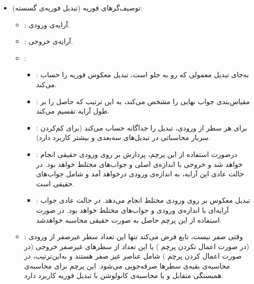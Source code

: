 \documentclass[12pt,a4paper]{article}
\theoremstyle{definition}
\theoremstyle{theorem}
\theoremstyle{definition}
\begin{document}
\begin{itemize}
\begin{itemize}
\end{itemize}

\item
توصیف‌گرهای فوریه (تبدیل فوریه‌ی گسسته): 


{\small {}}


\begin{itemize}
\renewcommand{\labelitemii}{$\circ$}
\item
{} : 
آرایه‌ی ورودی.
\item
{} : 
آرایه‌ی خروجی.

\item
{} : 

\begin{itemize}
\renewcommand{\labelitemiii}{$\diamond$}
\item
{} : 
 به‌جای تبدیل معمولی که رو به جلو است، تبدیل معکوس فوریه را حساب می‌کند.

\item
{} :
مقیاس‌بندی جواب نهایی را مشخص می‌کند، به این ترتیب که حاصل‌ را بر طول آرایه تقسیم می‌کند.

\item
{} :
برای هر سطر از ورودی، تبدیل را جداگانه حساب می‌کند (برای کم‌کردن سربار محاسباتی در تبدیل‌های سه‌بعدی و بیشتر کاربرد دارد).

\item
{} :
درصورت استفاده از این پرچم، پردازش بر روی ورودی حقیقی انجام خواهد شد و خروجی با اندازه‌ی اصلی و جواب‌های مختلط خواهد بود. در حالت عادی این آرایه، به اندازه‌ی ورودی درخواهد آمد و شامل جواب‌های حقیقی است.
\item
{} : 
تبدیل معکوس بر روی ورودی مختلط انجام می‌دهد. در حالت عادی جواب آرایه‌ای با اندازه‌ی ورودی و جواب‌های مختلط خواهد بود. در صورت استفاده از این پرچم حاصل به صورت حقیقی محاسبه خواهدشد. 
\end{itemize}

\item
{} : 
وقتی صفر نیست، تابع فرض می‌کند تنها این تعداد سطر غیرصفر از ورودی (در صورت اعمال نکردن پرچم 
) یا این تعداد از سطرهای غیرصفر خروجی (در صورت اعمال کردن پرچم 
) 
شامل عناصر غیر صفر هستند و به‌این‌ترتیب، در محاسبه‌ی بقیه‌ی سطرها صرفه‌جویی می‌شود. این پرچم برای محاسبه‌ی همبستگی متقابل 
و یا محاسبه‌ی کانولوشن با تبدیل فوریه کاربرد دارد.

\end{itemize}


\end{itemize}
\end{document}

